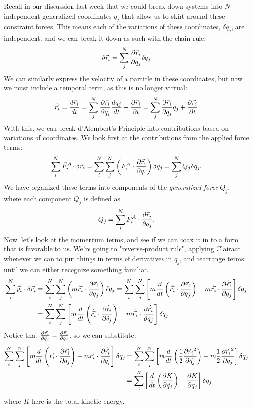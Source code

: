 Recall in our discussion last week that we could break down systems into $N$ independent generalized coordinates $q_j$ that allow us to skirt around these constraint forces. This means each of the variations of these coordinates, $\delta q_j$, are independent, and we can break it down as such with the chain rule:
\[
	\delta \vec r_i = \sum_j^N \frac{\partial \vec r_i}{\partial q_j} \delta q_j
\]	
We can similarly express the velocity of a particle in these coordinates, but now we must include a temporal term, as this is no longer virtual: 
\[
 \dot{\vec{r_i}} = \frac{d \vec r_i}{d t} = \sum_j^N \frac{\partial \vec r_i}{\partial q_j} \frac{d q_j}{d t} + \frac{\partial \vec r_i}{\partial t} = \sum_j^N \frac{\partial \vec r_i}{\partial q_j} \dot q_j + \frac{\partial \vec r_i}{\partial t} 
\]
With this, we can break d'Alembert's Principle into contributions based on variations of coordinates. We look first at the contributions from the applied force terms: 
\[
	\sum_i^N \vec F_i^A \cdot \delta \vec r_i = \sum_i^N \sum_j^N \left(F_i^A \cdot \frac{\partial \vec r_i}{\partial q_j} \right) \delta q_j = \sum_j^N Q_j \delta q_j.
\]
We have organized these terms into components of the \textit{generalized force} $Q_j$, where each component $Q_j$ is defined as 
\[
	Q_j = \sum_i^N F_i^A \cdot \frac{\partial \vec r_i}{\partial q_j}.
\]
Now, let's look at the momentum terms, and see if we can coax it in to a form that is favorable to us. We're going to "reverse-product rule", applying Clairaut whenever we can to put things in terms of derivatives in $q_j$, and rearrange terms until we can either recognize something familiar.
\begin{align*}
	\sum_i^N \dot{\vec{p_i}} \cdot \delta \vec r_i &= \sum_i^N \sum_j^N \left( m \ddot{\vec {r_i}} \cdot \frac{\partial \vec r_i}{\partial q_j} \right) \delta q_j  = \sum_i^N \sum_j^N \left[ m\frac{d }{d t} \left(\dot{\vec{r_i}} \cdot \frac{\partial \vec r_i}{\partial q_j} \right) - m \dot{\vec{r_i}} \cdot \frac{\partial \dot{\vec {r_i}}}{\partial q_j} \right]\delta q_j \\
	&= \sum_i^N \sum_j^N \left[m \frac{d }{d t} \left(\dot{\vec{r_i}}  \cdot \frac{\partial \dot{\vec{r_i}}}{\partial \dot{q_j}} \right)  - m \dot{\vec{r_i}} \cdot \frac{\partial \dot{\vec{r_i}}}{\partial q_j} \right] \delta q_j 
\end{align*}
Notice that $\frac{\partial \dot{\vec{r_i}}}{\partial \dot{q_j}} = \frac{\partial \vec r_i}{\partial q_j}$, so we can substitute:
\begin{align*}
\sum_i^N \sum_j^N \left[m \frac{d }{d t} \left(\dot{\vec{r_i}}  \cdot \frac{\partial \dot{\vec{r_i}}}{\partial \dot{q_j}} \right)  - m \dot{\vec{r_i}} \cdot \frac{\partial \dot{\vec{r_i}}}{\partial q_j} \right] \delta q_j 
	&= \sum_i^N \sum_j^N \left[m \frac{d }{d t} \left( \frac{1}{2} \frac{\partial \dot{r_i}^2}{\partial \dot{q_j}} \right)  - m \frac{1}{2} \frac{\partial \dot{r_i}^2}{\partial q_j} \right] \delta q_j  \\
	&=  \sum_j^N \left[ \frac{d }{d t} \left( \frac{\partial K}{\partial \dot{q_j}} \right) - \frac{\partial K}{\partial q_j} \right] \delta q_j 
\end{align*}
where $K$ here is the total kinetic energy. 


